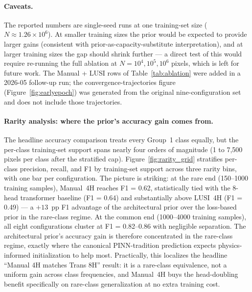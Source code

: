 \documentclass[preprint,12pt]{elsarticle}
\begin{document}
\paragraph{Caveats.}
The reported numbers are single-seed runs at one training-set size ($N \approx 1.26 \times 10^{6}$).
At smaller training sizes the prior would be expected to provide larger gains (consistent with prior-as-capacity-substitute interpretation), and at larger training sizes the gap should shrink further --- a direct test of this would require re-running the full ablation at $N = 10^4, 10^5, 10^6$ pixels, which is left for future work.
The Manual + LUSI rows of Table~\ref{tab:ablation} were added in a 2026-05 follow-up run; the convergence-trajectories figure (Figure~\ref{fig:earlyepoch}) was generated from the original nine-configuration set and does not include those trajectories.

\paragraph{Rarity analysis: where the prior's accuracy gain comes from.}
The headline accuracy comparison treats every Group~1 class equally, but the per-class training-set support spans nearly four orders of magnitude (1 to 7{,}500 pixels per class after the stratified cap). Figure~\ref{fig:rarity_grid} stratifies per-class precision, recall, and F1 by training-set support across three rarity bins, with one bar per configuration. The picture is striking: at the rare end (150--1000 training samples), Manual~4H reaches F1 = 0.62, statistically tied with the 8-head transformer baseline (F1 = 0.64) and substantially above LUSI~4H (F1 = 0.49) --- a $+13$~pp F1 advantage of the architectural prior over the loss-based prior in the rare-class regime. At the common end (1000--4000 training samples), all eight configurations cluster at F1 = 0.82--0.86 with negligible separation. The architectural prior's accuracy gain is therefore concentrated in the rare-class regime, exactly where the canonical PINN-tradition prediction expects physics-informed initialization to help most. Practically, this localizes the headline ``Manual 4H matches Trans 8H'' result: it is a rare-class equivalence, not a uniform gain across class frequencies, and Manual~4H buys the head-doubling benefit specifically on rare-class generalization at no extra training cost.
\end{document}
